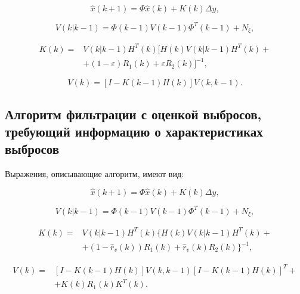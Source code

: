 \begin{equation}\label{eq3:optim3}
\hat{x}(k+1)=\Phi\hat{x}(k)+K(k)\Delta y,
\end{equation}

\begin{equation}\label{eq3:optim3_3}
V(k|k-1)=\Phi(k-1)V(k-1)\Phi^T(k-1)+N_\xi,
\end{equation}

\begin{equation}\label{eq3:optim3_4}
\begin{split}
K(k)=&V(k|k-1)H^T(k)[H(k)V(k|k-1)H^T(k)+\\
&+(1-\varepsilon)R_1(k)+\varepsilon R_2(k)]^{-1},
\end{split}
\end{equation}

\begin{equation}\label{eq3:optim3_5}
V(k)=[I-K(k-1)H(k)]V(k,k-1).
\end{equation}

\subsection{Алгоритм фильтрации с оценкой выбросов, требующий информацию о характеристиках выбросов} 
Выражения, описывающие алгоритм, имеют вид:

\begin{equation}\label{eq3:optim4}
\hat{x}(k+1)=\Phi\hat{x}(k)+K(k)\Delta y,
\end{equation}

\begin{equation}\label{eq3:optim4_3}
V(k|k-1)=\Phi(k-1)V(k-1)\Phi^T(k-1)+N_\xi,
\end{equation}

\begin{equation}\label{eq3:optim4_4}
\begin{split}
K(k)=&V(k|k-1)H^T(k)\{H(k)V(k|k-1)H^T(k)+\\
&+(1-\hat{r}_v(k))R_1(k)+\hat{r}_v(k)R_2(k)\}^{-1},
\end{split}
\end{equation}

\begin{equation}\label{eq3:optim4_5}
\begin{split}
V(k)=&[I-K(k-1)H(k)]V(k,k-1)[I-K(k-1)H(k)]^T+\\
&+K(k)R_1(k)K^T(k).
\end{split}
\end{equation}

